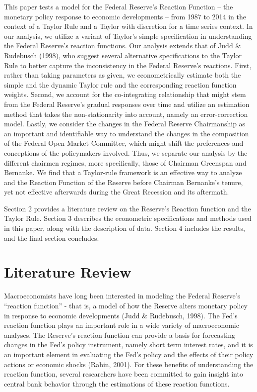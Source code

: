 \documentclass[notitlepage,12pt]{article}
\begin{document}
This paper tests a model for the Federal Reserve's Reaction Function -- the monetary policy response to economic developments -- from 1987 to 2014 in the context of a Taylor Rule and a Taylor with discretion for a time series context. In our analysis, we utilize a variant of Taylor's simple specification in understanding the Federal Reserve's reaction functions. Our analysis extends that of Judd \& Rudebusch (1998), who suggest several alternative specifications to the Taylor Rule to better capture the inconsistency in the Federal Reserve’s reactions. First, rather than taking parameters as given, we econometrically estimate both the simple and the dynamic Taylor rule and the corresponding reaction function weights. Second, we account for the co-integrating relationship that might stem from the Federal Reserve’s gradual responses over time and utilize an estimation method that takes the non-stationarity into account, namely an error-correction model. Lastly, we consider the changes in the Federal Reserve Chairmanship as an important and identifiable way to understand the changes in the composition of the Federal Open Market Committee, which might shift the preferences and conceptions of the policymakers involved. Thus, we separate our analysis by the different chairmen regimes, more specifically, those of Chairman Greenspan and Bernanke. We find that a Taylor-rule framework is an effective way to analyze and the Reaction Function of the Reserve before Chairman Bernanke's tenure, yet not effective afterwards during the Great Recession and its aftermath.

	Section 2 provides a literature review on the Reserve's Reaction function and the Taylor Rule. Section 3 describes the econometric specifications and methods used in this paper, along with the description of data. Section 4 includes the results, and the final section concludes.


\section{Literature Review}
Macroeconomists have long been interested in modeling the Federal Reserve’s “reaction function” - that is, a model of how the Reserve alters monetary policy in response to economic developments (Judd \& Rudebusch, 1998). The Fed's reaction function plays an important role in a wide variety of macroeconomic analyses. The Reserve's reaction function can provide a basis for forecasting changes in the Fed's policy instrument, namely short term interest rates, and it is an important element in evaluating the Fed's policy and the effects of their policy actions or economic shocks (Rabin, 2001). For these benefits of understanding the reaction function, several researchers have been committed to gain insight into central bank behavior through the estimations of these reaction functions. 
\end{document}
